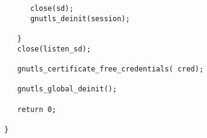 \begin{verbatim}
      close(sd);
      gnutls_deinit(session);

   }
   close(listen_sd);

   gnutls_certificate_free_credentials( cred);

   gnutls_global_deinit();

   return 0;

}

\end{verbatim}
